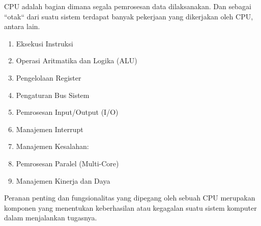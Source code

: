 CPU adalah bagian dimana segala pemrosesan data dilaksanakan.
Dan sebagai ``otak`` dari suatu sistem terdapat banyak pekerjaan yang dikerjakan oleh CPU, antara lain.

\begin{enumerate}[label=\alph*.]
  \item Eksekusi Instruksi
  \item Operasi Aritmatika dan Logika (ALU)
  \item Pengelolaan Register
  \item Pengaturan Bus Sistem
  \item Pemrosesan Input/Output (I/O)
  \item Manajemen Interrupt
  \item Manajemen Kesalahan:
  \item Pemrosesan Paralel (Multi-Core)
  \item Manajemen Kinerja dan Daya
\end{enumerate}

Peranan penting dan fungsionalitas yang dipegang oleh sebuah CPU merupakan komponen yang menentukan
keberhasilan atau kegagalan suatu sistem komputer dalam menjalankan tugasnya.
